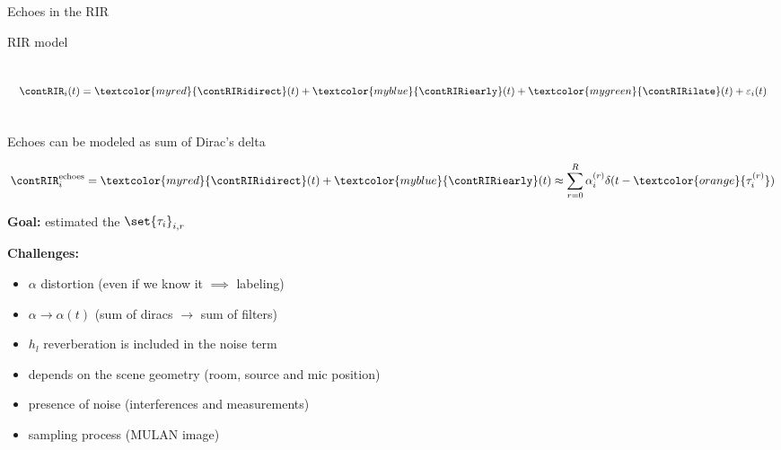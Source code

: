 \begin{frame}{Echoes in the RIR}

    RIR model
    \begin{columns}
        \begin{equation*}
            \contRIR_i(t) = \textcolor{myred}{\contRIRidirect}(t)
                          + \textcolor{myblue}{\contRIRiearly}(t)
                          + \textcolor{mygreen}{\contRIRilate}(t)
                          + \varepsilon_i(t)
        \end{equation*}

        \includegraphics[width=.8\textwidth]{figures/rir_measured.png}

    \end{columns}

    Echoes can be modeled as sum of Dirac's delta

    \begin{equation*}
        \contRIR_i^\text{echoes} = \textcolor{myred}{\contRIRidirect}(t) + \textcolor{myblue}{\contRIRiearly}(t)
            \approx \sum_{r=0}^{R} \alpha_i^{(r)} \delta(t - \textcolor{orange}{\tau_i^{(r)}})
    \end{equation*}

    \textbf{Goal:} estimated the $\set{\tau_i}_{i,r}$

    \textbf{Challenges:}
    \begin{itemize}
        \item $\alpha$ distortion (even if we know it $\implies$ labeling)
        \item $\alpha \to \alpha(t)$ (sum of diracs $\to$ sum of filters)
        \item $h_l$ reverberation is included in the noise term
        \item depends on the scene geometry (room, source and mic position)
        \item presence of noise (interferences and measurements)
        \item sampling process (MULAN image)
    \end{itemize}

\end{frame}

